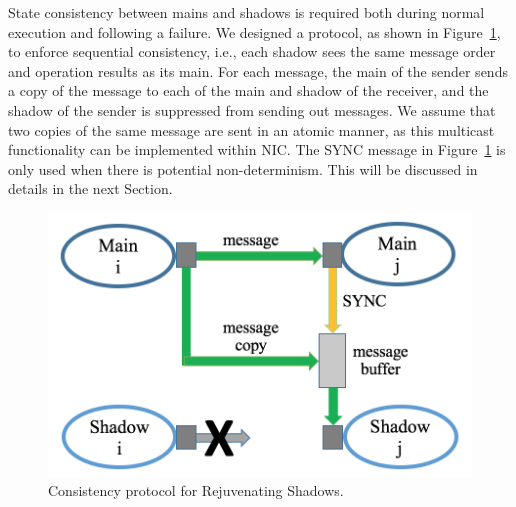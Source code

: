 
State consistency between mains and shadows is required both during normal execution and following a failure. %
We designed a protocol, as shown in Figure~\ref{fig:cons_protocol}, 
to enforce sequential consistency, i.e., each shadow sees the same message order and operation results as its main. 
For each message, the main of the sender sends a copy of the message to each of the main and shadow of the receiver, and the shadow of the sender is suppressed from sending out messages. We assume that two copies of the same message are sent in an atomic manner, as this multicast functionality 
can be implemented within NIC. The SYNC message in Figure~\ref{fig:cons_protocol} is only used when there is potential non-determinism. This will be discussed in details in the next Section.


\begin{figure}[!t]
  \begin{center}
      	\includegraphics[width=0.7\columnwidth]{figures/consistency}
  \end{center}
  \caption{Consistency protocol for Rejuvenating Shadows.}
  \label{fig:cons_protocol}
\end{figure}


